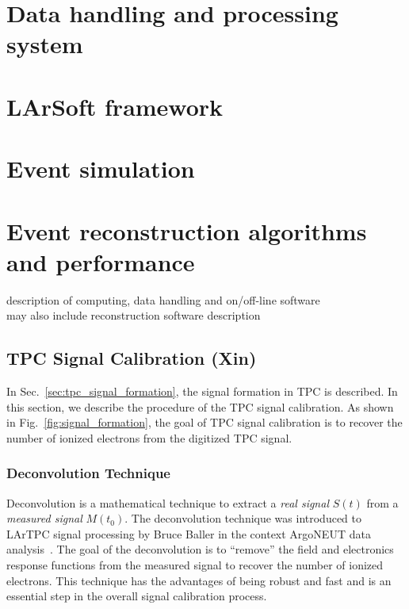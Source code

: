 
\section{Data handling and processing system}

\section{LArSoft framework}

\section{Event simulation}

\section{Event reconstruction algorithms and performance}

description of computing, data handling and on/off-line software\\

may also include reconstruction software description

\subsection{TPC Signal Calibration (Xin)}

In Sec.~\ref{sec:tpc_signal_formation}, the signal formation in TPC
is described. In this section, we describe the procedure of the TPC signal
calibration. As shown in Fig.~\ref{fig:signal_formation}, the goal of TPC 
signal calibration is to recover the number of ionized electrons from the 
digitized TPC signal. 

\subsubsection{Deconvolution Technique}\label{sec:decon}
Deconvolution is a mathematical technique to extract a \textit{real signal}
$S(t)$ from a \textit{measured signal} $M(t_0)$. 
The deconvolution technique was introduced to LArTPC signal processing by 
Bruce Baller in the context ArgoNEUT data analysis~\cite{bruce}. The goal of the 
deconvolution is to ``remove'' the field and electronics response functions 
from the measured signal to recover the number of ionized electrons. This 
technique has the advantages of being robust and fast and is an essential 
step in the overall signal calibration process. 

